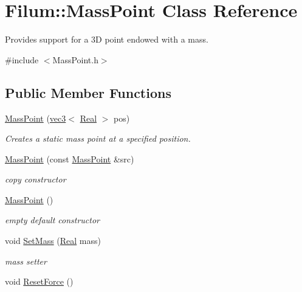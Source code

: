 \hypertarget{class_filum_1_1_mass_point}{\section{Filum\-:\-:Mass\-Point Class Reference}
\label{class_filum_1_1_mass_point}
}


Provides support for a 3\-D point endowed with a mass.  




{\ttfamily \#include $<$Mass\-Point.\-h$>$}

\subsection*{Public Member Functions}
\begin{DoxyCompactItemize}
\item 
\hyperlink{class_filum_1_1_mass_point_a6b612a975a88eb1cd6f30bc70fb0145c}{Mass\-Point} (\hyperlink{structvmath_1_1vec3}{vec3}$<$ \hyperlink{stdafx_8h_a445a5f0e2a34c9d97d69a3c2d1957907}{Real} $>$ pos)
\begin{DoxyCompactList}\small\item\em Creates a static mass point at a specified position. \end{DoxyCompactList}\item 
\hyperlink{class_filum_1_1_mass_point_ab83e3be6bd5ce034a16932a4dc39f2de}{Mass\-Point} (const \hyperlink{class_filum_1_1_mass_point}{Mass\-Point} \&src)
\begin{DoxyCompactList}\small\item\em copy constructor \end{DoxyCompactList}\item 
\hyperlink{class_filum_1_1_mass_point_aaa6fa23a579d26700a5956401fc275fc}{Mass\-Point} ()
\begin{DoxyCompactList}\small\item\em empty default constructor \end{DoxyCompactList}\item 
void \hyperlink{class_filum_1_1_mass_point_a626d3c5769b34c8ccc87191810fe6755}{Set\-Mass} (\hyperlink{stdafx_8h_a445a5f0e2a34c9d97d69a3c2d1957907}{Real} mass)
\begin{DoxyCompactList}\small\item\em mass setter \end{DoxyCompactList}\item 
void \hyperlink{class_filum_1_1_mass_point_a0efb6566daacda9a9b536f28005d6cfa}{Reset\-Force} ()

\end{DoxyCompactItemize}
